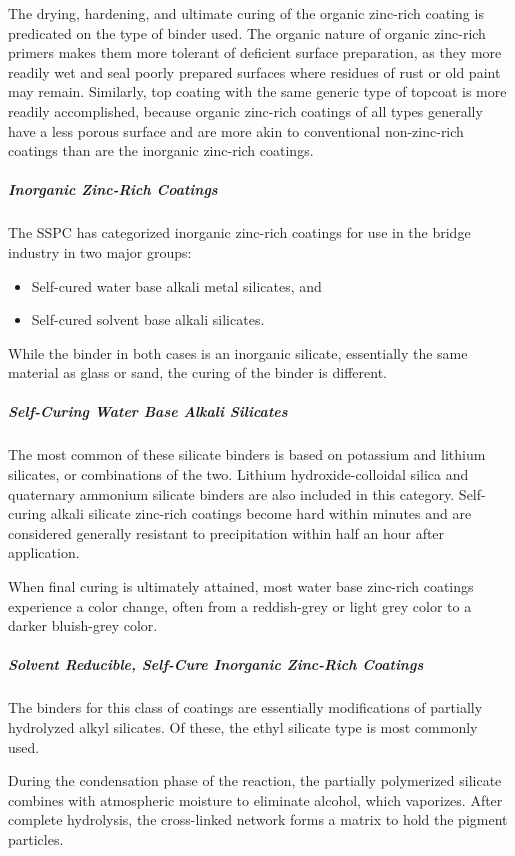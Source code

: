 The drying, hardening, and ultimate curing of the organic zinc-rich coating is predicated on the type of binder
used. The organic nature of organic zinc-rich primers makes them more tolerant of deficient surface preparation, as they more readily wet and seal poorly prepared surfaces where residues of rust or old paint may remain. Similarly,
top coating with the same generic type of topcoat is more readily accomplished, because organic zinc-rich coatings of
all types generally have a less porous surface and are more akin to conventional non-zinc-rich coatings than are the
inorganic zinc-rich coatings.

\subparagraph{Inorganic Zinc-Rich Coatings}
The SSPC has categorized inorganic zinc-rich coatings for use in the bridge industry in two major groups:
\begin{itemize}
  \item Self-cured water base alkali metal silicates, and
  \item Self-cured solvent base alkali silicates.
\end{itemize}

While the binder in both cases is an inorganic silicate, essentially the same material as glass or sand, the curing of
the binder is different.


\subparagraph{Self-Curing Water Base Alkali Silicates}
The most common of these silicate binders is based on potassium and lithium silicates, or combinations of the
two. Lithium hydroxide-colloidal silica and quaternary ammonium silicate binders are also included in this category.
Self-curing alkali silicate zinc-rich coatings become hard within minutes and are considered generally resistant to
precipitation within half an hour after application.

When final curing is ultimately attained, most water base zinc-rich coatings experience a color change, often
from a reddish-grey or light grey color to a darker bluish-grey color.


\subparagraph{Solvent Reducible, Self-Cure Inorganic Zinc-Rich Coatings}
The binders for this class of coatings are essentially modifications of partially hydrolyzed alkyl silicates. Of
these, the ethyl silicate type is most commonly used.

During the condensation phase of the reaction, the partially polymerized silicate combines with atmospheric
moisture to eliminate alcohol, which vaporizes. After complete hydrolysis, the cross-linked network forms a matrix
to hold the pigment particles.


